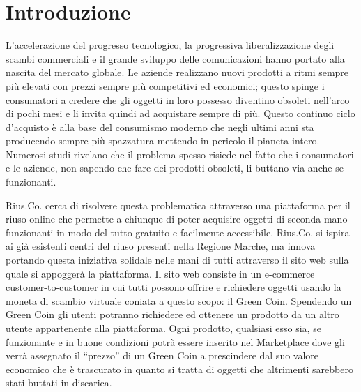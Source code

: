 \section{Introduzione}
L'accelerazione del progresso tecnologico, la progressiva liberalizzazione degli scambi commerciali e il grande sviluppo delle comunicazioni hanno portato alla nascita del mercato globale. Le aziende realizzano nuovi prodotti a ritmi sempre più elevati con prezzi sempre più competitivi ed economici; questo spinge i consumatori a credere che gli oggetti in loro possesso diventino obsoleti nell'arco di pochi mesi e li invita quindi ad acquistare sempre di più. Questo continuo ciclo d'acquisto è alla base del consumismo moderno che negli ultimi anni sta producendo sempre più spazzatura mettendo in pericolo il pianeta intero. Numerosi studi \cite{Sprechi} rivelano che il problema spesso risiede nel fatto che i consumatori e le aziende, non sapendo che fare dei prodotti obsoleti, li buttano via anche se funzionanti. 
\medskip

Rius.Co. cerca di risolvere questa problematica attraverso una piattaforma per il riuso online che permette a chiunque di poter acquisire oggetti di seconda mano funzionanti in modo del tutto gratuito e facilmente accessibile. Rius.Co. si ispira ai già esistenti centri del riuso presenti nella Regione Marche, ma innova portando questa iniziativa solidale nelle mani di tutti attraverso il sito web sulla quale si appoggerà la piattaforma. Il sito web consiste in un e-commerce customer-to-customer in cui tutti possono offrire e richiedere oggetti usando la moneta di scambio virtuale coniata a questo scopo: il Green Coin. Spendendo un Green Coin gli utenti potranno richiedere ed ottenere un prodotto da un altro utente appartenente alla piattaforma. Ogni prodotto, qualsiasi esso sia, se funzionante e in buone condizioni potrà essere inserito nel Marketplace dove gli verrà assegnato il “prezzo” di un Green Coin a prescindere dal suo valore economico che è trascurato in quanto si tratta di oggetti che altrimenti sarebbero stati buttati in discarica. 
\medskip

